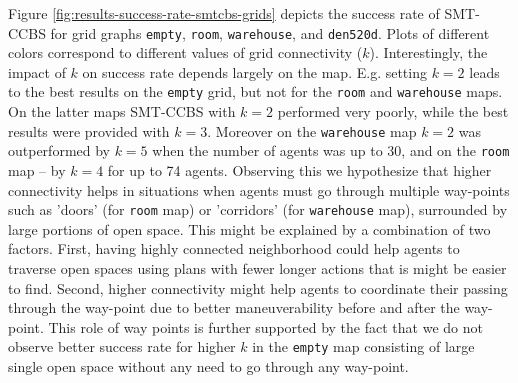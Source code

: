 \documentclass[review]{elsarticle}
\newcommand\konstantin[1]{\nb{\textbf{Konstantin:}}{red}{#1}}
\newcommand\roni[1]{\nb{\textbf{Roni:}}{green}{#1}}
\newcommand{\ccbs}{\ac{CCBS}\xspace}
\newcommand{\smtccbs}{SMT-CCBS\xspace}
\begin{document}
Figure \ref{fig:results-success-rate-smtcbs-grids} depicts the success rate of \smtccbs for grid graphs \texttt{empty}, \texttt{room}, \texttt{warehouse}, and \texttt{den520d}. 
Plots of different colors correspond to different values of grid connectivity ($k$). Interestingly, the impact of $k$ on success rate depends largely on the map. E.g. setting $k=2$ leads to the best results on the \texttt{empty} grid, but not for the \texttt{room} and \texttt{warehouse} maps. On the latter maps \smtccbs with $k=2$ performed very poorly, while the best results were provided with $k=3$. Moreover on the \texttt{warehouse} map $k=2$ was outperformed by $k=5$ when the number of agents was up to 30, and on the \texttt{room} map -- by $k=4$ for up to 74 agents. Observing this we hypothesize that higher connectivity helps in situations when agents must go through multiple way-points such as 'doors' (for \texttt{room} map) or 'corridors' (for \texttt{warehouse} map), surrounded by large portions of open space. This might be explained by a combination of two factors. First, having highly connected neighborhood could help agents to traverse open spaces using plans with fewer longer actions that is might be easier to find. Second, higher connectivity might help agents to coordinate their passing through the way-point due to better maneuverability before and after the way-point. This role of way points is further supported by the fact that we do not observe better success rate for higher $k$ in the \texttt{empty} map consisting of large single open space without any need to go through any way-point.

\end{document}

